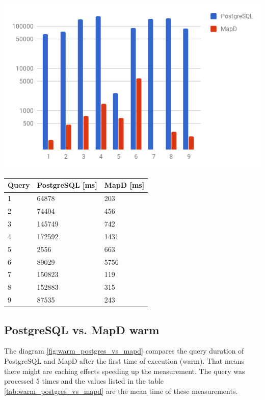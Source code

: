 \begin{minipage}{\textwidth}
  \begin{minipage}[b]{0.59\textwidth}
    \centering
     \includegraphics[width=1.0\textwidth,height=1.0\textheight,keepaspectratio]{images/cold_postgres_vs_mapd.png}
    \label{fig:cold_postgres_vs_mapd}
  \end{minipage}
  \hfill
  \begin{minipage}[b]{0.39\textwidth}
    \centering
  \begin{tabular}{ |p{1cm}|p{2cm}|p{2cm}| }
    \hline
    Query & PostgreSQL [ms] & MapD [ms] \\
    \hline
    1 & 64878 & 203 \\
    2 & 74404 & 456 \\
    3 & 145749 & 742 \\
    4 & 172592 & 1431 \\
    5 & 2556 & 663 \\
    6 & 89029 & 5756 \\
    7 & 150823 & 119 \\
    8 & 152883 & 315 \\
    9 & 87535 & 243 \\
    \hline
\end{tabular}
            \label{tab:cold_postgres_vs_mapd}
    \end{minipage}
 \end{minipage}

\newpage
\subsection{PostgreSQL vs. MapD warm}
The diagram \ref{fig:warm_postgres_vs_mapd} compares the query duration of PostgreSQL and MapD after the first time of execution (warm).
That means there might are caching effects speeding up the measurement.
The query was processed 5 times and the values listed in the table \ref{tab:warm_postgres_vs_mapd} are the mean time of these measurements.

